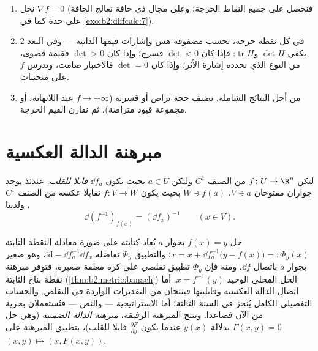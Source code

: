 \begin{method}\label{met:b2:diffcalc:extrema}
\begin{enumerate}
  \item نحل $\nabla f = 0$ (فنحصل على جميع النقاط الحرجة؛ وعلى مجال ذي حافة
        نعالج الحافة على حدة كما في
        \cref{exo:b2:diffcalc:7}).
  \item في كل نقطة حرجة، نحسب مصفوفة هس وإشارات قيمها الذاتية ---
        وفي البعد $2$ يكفي $\det H$ و$\operatorname{tr} H$: فإذا كان $\det < 0$ فسرج؛ وإذا
        كان $\det >
        0$ فقيمة قصوى، من النوع الذي تحدده إشارة الأثر؛ وإذا
        كان $\det = 0$ فالاختبار صامت، وندرس $f$ على منحنيات.
  \item من أجل النتائج الشاملة، نضيف حجة تراص أو قسرية ($f \to +\infty$ عند
        اللانهاية، أو مجموعة قيود متراصة)، ثم نقارن القيم الحرجة.
\end{enumerate}
\end{method}

\section{مبرهنة الدالة العكسية}

\begin{theorem}\label{thm:b2:diffcalc:inverse}
لتكن $f \colon U \to \R^n$ من الصنف $C^1$ ولتكن $a \in U$ بحيث يكون $\dd f_a$
\emph{قابلا للقلب}. عندئذ يوجد جواران مفتوحان $V \ni a$، $W
\ni f(a)$ بحيث
يكون $f \colon V \to W$ تقابلا عكسه من الصنف $C^1$، ولدينا
\[
\dd (f^{-1})_{f(x)} = (\dd f_x)^{-1} \qquad (x \in V).
\]
\end{theorem}
\admitted

\begin{remark}
حل $f(x) = y$ بجوار $a$ يُعاد كتابته على صورة معادلة النقطة الثابتة
$x = x + \dd f_a^{-1}\bigl(y - f(x)\bigr) =: \Phi_y(x)$؛ والتطبيق
$\Phi_y$ تفاضله $\mathrm{id} - \dd f_a^{-1}\dd f_x$، وهو صغير بجوار $a$ باتصال $\dd f$، ومنه فإن
$\Phi_y$ تطبيق تقلصي على كرة مغلقة صغيرة، فتوفر مبرهنة نقطة بناخ
الثابتة (\cref{thm:b2:metric:banach}) الحل المحلي الوحيد $x = f^{-1}(y)$. أما اتصال الدالة
العكسية وقابليتها  فينتجان من التقديرات الواردة في التقلص.
والحساب التفصيلي الكامل يُنجز في السنة الثالثة؛ أما الاستراتيجية ---
والنص --- فتُستعملان بحرية من الآن فصاعدا. وتنتج المبرهنة الرفيقة،
\emph{مبرهنة الدالة الضمنية} (وهي حل $F(x, y) = 0$ بدلالة $y(x)$ عندما
يكون $\frac{\partial F}{\partial y}$ قابلا للقلب)، بتطبيق المبرهنة على $(x, y) \mapsto (x, F(x,y))$.
\end{remark}

